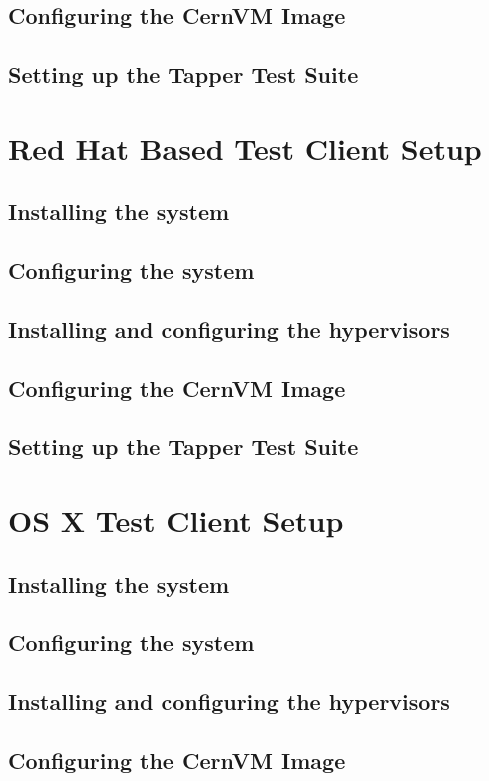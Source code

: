 \subsection{Configuring the CernVM Image}
\subsection{Setting up the Tapper Test Suite}

\section{Red Hat Based Test Client Setup}
\subsection{Installing the system}
\subsection{Configuring the system}
\subsection{Installing and configuring the hypervisors}
\subsection{Configuring the CernVM Image}
\subsection{Setting up the Tapper Test Suite}

\section{OS X Test Client Setup}
\subsection{Installing the system}
\subsection{Configuring the system}
\subsection{Installing and configuring the hypervisors}
\subsection{Configuring the CernVM Image}
